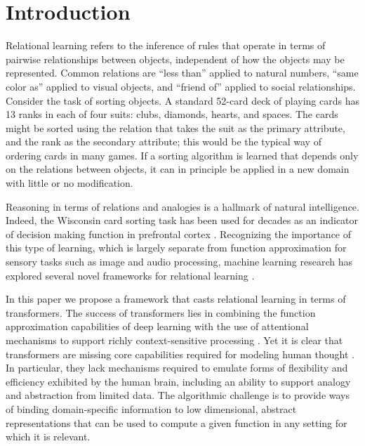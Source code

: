 \section{Introduction}
\label{sec:intro}

Relational learning refers to the inference of rules that operate in terms of pairwise relationships between 
objects, independent of how the objects may be represented. Common relations are ``less than'' applied to natural numbers, ``same color as'' applied to visual objects, and ``friend of'' applied to social relationships. Consider the task of sorting objects. A standard 52-card deck of playing cards has 13 ranks in each of four suits: clubs, diamonds, hearts, and spaces. The cards might be sorted using the relation that takes 
the suit as the primary attribute, and the rank as the secondary attribute; this would be the typical 
way of ordering cards in many games. If a sorting algorithm is learned that depends 
only on the relations between objects, it can in principle be applied in a new domain with little 
or no modification. 

Reasoning in terms of relations and analogies is a hallmark of natural intelligence. 
Indeed, the Wisconsin card sorting task \citep{berg} has been used for decades as an indicator of decision making function in prefrontal cortex \citep{monchi}. Recognizing the importance of this type of learning, which is largely separate from function approximation for sensory tasks such as image and audio processing, machine learning research has explored several novel frameworks for relational learning \citep{TEM, NTM,episodicControl,esbn,mondal23learned,musslick2021rationalizing,battaglia,barrett:2018,santoro1} .

In this paper we propose a framework that casts relational learning in terms of transformers. 
The success of transformers lies in combining the function approximation capabilities of deep learning with the use of attentional mechanisms to support richly context-sensitive processing \citep{transformers,vaswani2017attention,kerg2020untangling}. Yet it is clear that transformers are missing core capabilities required for modeling human thought \citep{mahowald2023dissociating}.  In particular, they lack mechanisms required to emulate forms of flexibility and efficiency exhibited by the human brain, including an ability to support analogy and abstraction from limited data. The algorithmic challenge is to provide ways of binding domain-specific information to low dimensional, abstract representations that can be used to compute a given function in any setting for which it is relevant. 

